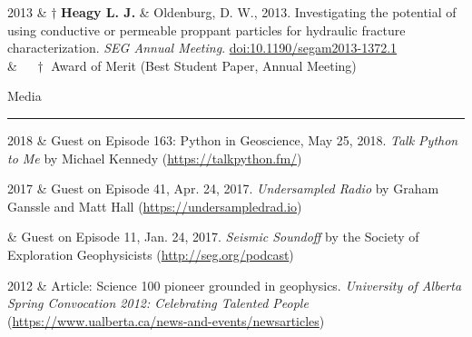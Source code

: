 \documentclass[a4paper, 11pt]{article}
\newcommand{\doi}[1]{\href{https://doi.org/#1}{doi:#1}}
\newcommand{\heading}[1]{
    \begin{minipage}[t]{\textwidth}
    \vspace{0.45cm}
    {\LARGE #1}\\
    \vspace{-0.2cm}
    \hrule
    \end{minipage}
    \vspace{0.2cm}

}
\begin{document}
\begin{entryright}
2013 & $\dagger$ \textbf{Heagy L. J.} \& Oldenburg, D. W., 2013. Investigating the potential of using conductive or permeable proppant particles for hydraulic fracture characterization. \emph{SEG Annual Meeting}. \doi{10.1190/segam2013-1372.1} \\
& $\quad\dagger$ Award of Merit (Best Student Paper, Annual Meeting)
\end{entryright}




\heading{Media}

\begin{entryright}
2018 & Guest on Episode 163: Python in Geoscience, May 25, 2018. \emph{Talk Python to Me} by Michael Kennedy (\href{https://talkpython.fm/episodes/show/163/python-in-geoscience}{https://talkpython.fm/})
\end{entryright}

\begin{entryright}
2017 & Guest on Episode 41, Apr. 24, 2017. \emph{Undersampled Radio} by Graham Ganssle and Matt Hall (\href{https://undersampledrad.io/home/2017/4/inverterizer}{https://undersampledrad.io})
\end{entryright}

\begin{entryright}
 & Guest on Episode 11, Jan. 24, 2017. \emph{Seismic Soundoff} by the Society of Exploration Geophysicists (\href{http://seg.org/podcast/Post/4610/Episode-11-Geophysical-Electromagnetics-2017-DISC}{http://seg.org/podcast})
\end{entryright}

\begin{entryright}
2012 & Article: Science 100 pioneer grounded in geophysics. \emph{University of Alberta Spring Convocation 2012: Celebrating Talented People} (\href{https://www.ualberta.ca/news-and-events/newsarticles/2012/06/science100pioneergroundedingeophysics}{https://www.ualberta.ca/news-and-events/newsarticles})
\end{entryright}
\end{document}
